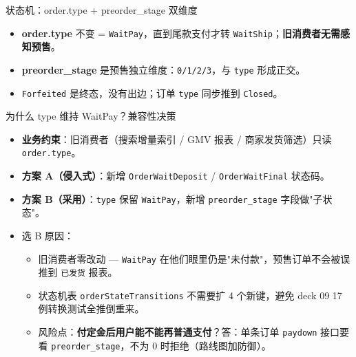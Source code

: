\documentclass[aspectratio=169,11pt]{beamer}
\begin{document}
\begin{frame}[shrink]{状态机：order.type + preorder\_stage 双维度}
\begin{center}
\end{center}
\vspace{1mm}
\begin{itemize}\small
  \item \textbf{order.type} 不变 = \texttt{WaitPay}，直到尾款支付才转 \texttt{WaitShip}；\textbf{旧消费者无需感知预售}。
  \item \textbf{preorder\_stage} 是预售独立维度：\texttt{0/1/2/3}，与 \texttt{type} 形成正交。
  \item \texttt{Forfeited} 是终态，没有出边；订单 \texttt{type} 同步推到 \texttt{Closed}。
\end{itemize}
\end{frame}

\begin{frame}[shrink]{为什么 type 维持 WaitPay？兼容性决策}
\begin{itemize}\small
  \item \textbf{业务约束}：旧消费者（搜索增量索引 / GMV 报表 / 商家发货筛选）只读 \texttt{order.type}。
  \item \textbf{方案 A（侵入式）}：新增 \texttt{OrderWaitDeposit} / \texttt{OrderWaitFinal} 状态码。
  \item \textbf{方案 B（采用）}：\texttt{type} 保留 \texttt{WaitPay}，新增 \texttt{preorder\_stage} 字段做"子状态"。
  \item 选 B 原因：
    \begin{itemize}\footnotesize
      \item 旧消费者零改动 — \texttt{WaitPay} 在他们眼里仍是"未付款"，预售订单不会被误推到 \texttt{已发货} 报表。
      \item 状态机表 \texttt{orderStateTransitions} 不需要扩 4 个新键，避免 deck 09 17 例转换测试全推倒重来。
      \item 风险点：\textbf{付定金后用户能不能再普通支付}？答：单条订单 \texttt{paydown} 接口要看 \texttt{preorder\_stage}，不为 0 时拒绝（路线图加防御）。
    \end{itemize}
\end{itemize}
\end{frame}
\end{document}
